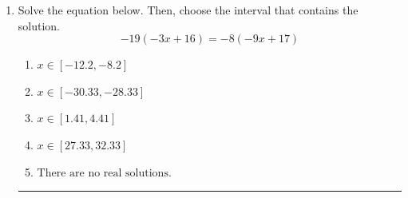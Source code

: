 \documentclass[14pt]{extbook}
\newcommand{\litem}[1]{\item#1\hspace*{-1cm}\rule{\textwidth}{0.4pt}}
\begin{document}
\begin{enumerate}
{\begin{enumerate}[label=\Alph*.]
\end{enumerate} }
\litem{
Solve the equation below. Then, choose the interval that contains the solution.\[ -19(-3x + 16) = -8(-9x + 17) \]\begin{enumerate}[label=\Alph*.]
\item \( x \in [-12.2, -8.2] \)
\item \( x \in [-30.33, -28.33] \)
\item \( x \in [1.41, 4.41] \)
\item \( x \in [27.33, 32.33] \)
\item \( \text{There are no real solutions.} \)

\end{enumerate} }
\end{enumerate}
\end{document}
